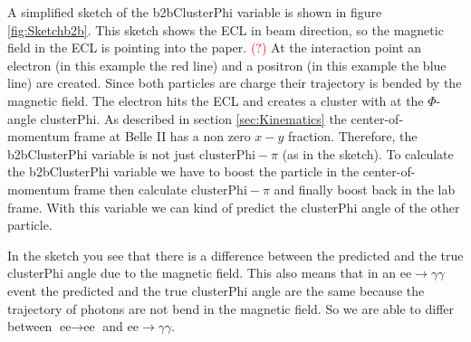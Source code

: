 \documentclass[a4paper,11pt,twosided,final,german,openbib,pdftex,listof=totoc,bibliography=totoc]{scrbook}
\begin{document}
A simplified sketch of the b2bClusterPhi variable is shown in figure \ref{fig:Sketchb2b}. This sketch shows the ECL in beam direction, so the magnetic field in the ECL is pointing into the paper. \textcolor{red}{(?)} At the interaction point an electron (in this example the red line) and a positron (in this example the blue line) are created. Since both particles are charge their trajectory is bended by the magnetic field. The electron hits the ECL and creates a cluster with at the $\Phi$-angle clusterPhi. As described in section \ref{sec:Kinematics} the center-of-momentum frame at Belle II has a non zero $x-y$ fraction. Therefore, the b2bClusterPhi variable is not just $\textrm{clusterPhi} - \pi$ (as in the sketch). To calculate the b2bClusterPhi variable we have to boost the particle in the center-of-momentum frame then calculate $\textrm{clusterPhi} - \pi$ and finally boost back in the lab frame. With this variable we can kind of predict the clusterPhi angle of the other particle. 

In the sketch you see that there is a difference between the predicted and the true clusterPhi angle due to the magnetic field. This also means that in an $\textrm{ee} \rightarrow \gamma \gamma$ event the predicted and the true clusterPhi angle are the same because the trajectory of photons are not bend in the magnetic field. So we are able to differ between $\textrm{ee} \rightarrow \textrm{ee}$ and $\textrm{ee} \rightarrow \gamma \gamma$.
\end{document}
